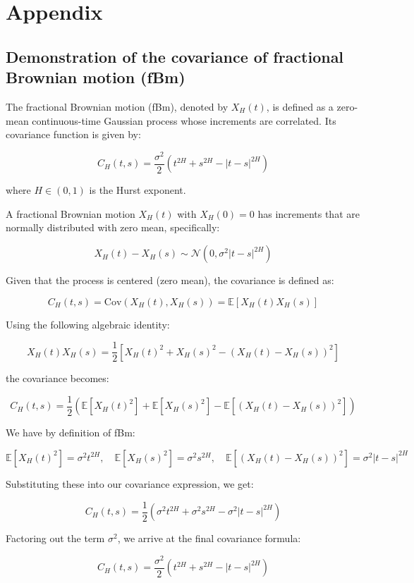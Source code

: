 \documentclass[11pt]{extarticle}
\begin{document}
\section{Appendix}

\subsection{Demonstration of the covariance of fractional Brownian motion (fBm)}
\label{sec:covariance_fbm}

The fractional Brownian motion (fBm), denoted by \( X_H(t) \), is defined as a zero-mean continuous-time Gaussian process whose increments are correlated. Its covariance function is given by:

\[
C_H(t,s) = \frac{\sigma^2}{2}\left(t^{2H}+s^{2H}-|t-s|^{2H}\right)
\]

where \( H \in (0,1) \) is the Hurst exponent.

A fractional Brownian motion \( X_H(t) \) with \( X_H(0)=0 \) has increments that are normally distributed with zero mean, specifically:

\[
X_H(t)-X_H(s) \sim \mathcal{N}(0,\sigma^2|t-s|^{2H})
\]

Given that the process is centered (zero mean), the covariance is defined as:

\[
C_H(t,s) = \text{Cov}(X_H(t), X_H(s)) = \mathbb{E}[X_H(t)X_H(s)]
\]

Using the following algebraic identity:

\[
X_H(t)X_H(s) = \frac{1}{2}\left[X_H(t)^2 + X_H(s)^2 - (X_H(t)-X_H(s))^2\right]
\]

the covariance becomes:

\[
C_H(t,s) = \frac{1}{2}\left(\mathbb{E}[X_H(t)^2]+\mathbb{E}[X_H(s)^2]-\mathbb{E}[(X_H(t)-X_H(s))^2]\right)
\]


We have by definition of fBm:

\[
\mathbb{E}[X_H(t)^2] = \sigma^2 t^{2H}, \quad \mathbb{E}[X_H(s)^2] = \sigma^2 s^{2H}, \quad \mathbb{E}[(X_H(t)-X_H(s))^2] = \sigma^2 |t-s|^{2H}
\]

Substituting these into our covariance expression, we get:

\[
C_H(t,s) = \frac{1}{2}\left(\sigma^2 t^{2H} + \sigma^2 s^{2H} - \sigma^2 |t-s|^{2H}\right)
\]


Factoring out the term \( \sigma^2 \), we arrive at the final covariance formula:

\[
\boxed{C_H(t,s) = \frac{\sigma^2}{2}\left(t^{2H} + s^{2H} - |t-s|^{2H}\right)}
\]
\end{document}
